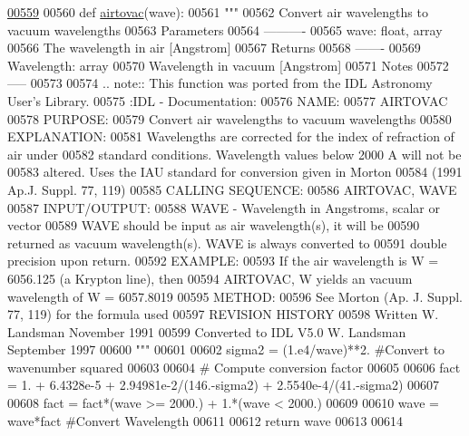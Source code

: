 \begin{DoxyCode}
\hypertarget{namespacepyneb_1_1utils_1_1physics_l00559}{}\hyperlink{namespacepyneb_1_1utils_1_1physics_aa6c19471b62528a32df5b8c371e69057}{00559} 
00560 \textcolor{keyword}{def }\hyperlink{namespacepyneb_1_1utils_1_1physics_aa6c19471b62528a32df5b8c371e69057}{airtovac}(wave):
00561     \textcolor{stringliteral}{"""}
00562 \textcolor{stringliteral}{Convert air wavelengths to vacuum wavelengths}
00563 \textcolor{stringliteral}{Parameters}
00564 \textcolor{stringliteral}{----------}
00565 \textcolor{stringliteral}{wave: float, array}
00566 \textcolor{stringliteral}{The wavelength in air [Angstrom]}
00567 \textcolor{stringliteral}{Returns}
00568 \textcolor{stringliteral}{-------}
00569 \textcolor{stringliteral}{Wavelength: array}
00570 \textcolor{stringliteral}{Wavelength in vacuum [Angstrom]}
00571 \textcolor{stringliteral}{Notes}
00572 \textcolor{stringliteral}{-----}
00573 \textcolor{stringliteral}{}
00574 \textcolor{stringliteral}{.. note:: This function was ported from the IDL Astronomy User's Library.}
00575 \textcolor{stringliteral}{:IDL - Documentation:}
00576 \textcolor{stringliteral}{NAME:}
00577 \textcolor{stringliteral}{AIRTOVAC}
00578 \textcolor{stringliteral}{PURPOSE:}
00579 \textcolor{stringliteral}{Convert air wavelengths to vacuum wavelengths}
00580 \textcolor{stringliteral}{EXPLANATION:}
00581 \textcolor{stringliteral}{Wavelengths are corrected for the index of refraction of air under}
00582 \textcolor{stringliteral}{standard conditions. Wavelength values below 2000 A will not be}
00583 \textcolor{stringliteral}{altered. Uses the IAU standard for conversion given in Morton}
00584 \textcolor{stringliteral}{(1991 Ap.J. Suppl. 77, 119)}
00585 \textcolor{stringliteral}{CALLING SEQUENCE:}
00586 \textcolor{stringliteral}{AIRTOVAC, WAVE}
00587 \textcolor{stringliteral}{INPUT/OUTPUT:}
00588 \textcolor{stringliteral}{WAVE - Wavelength in Angstroms, scalar or vector}
00589 \textcolor{stringliteral}{WAVE should be input as air wavelength(s), it will be}
00590 \textcolor{stringliteral}{returned as vacuum wavelength(s). WAVE is always converted to}
00591 \textcolor{stringliteral}{double precision upon return.}
00592 \textcolor{stringliteral}{EXAMPLE:}
00593 \textcolor{stringliteral}{If the air wavelength is W = 6056.125 (a Krypton line), then}
00594 \textcolor{stringliteral}{AIRTOVAC, W yields an vacuum wavelength of W = 6057.8019}
00595 \textcolor{stringliteral}{METHOD:}
00596 \textcolor{stringliteral}{See Morton (Ap. J. Suppl. 77, 119) for the formula used}
00597 \textcolor{stringliteral}{REVISION HISTORY}
00598 \textcolor{stringliteral}{Written W. Landsman November 1991}
00599 \textcolor{stringliteral}{Converted to IDL V5.0 W. Landsman September 1997}
00600 \textcolor{stringliteral}{    """}
00601     
00602     sigma2 = (1.e4/wave)**2. \textcolor{comment}{#Convert to wavenumber squared}
00603     
00604     \textcolor{comment}{# Compute conversion factor}
00605     
00606     fact = 1. + 6.4328e-5 + 2.94981e-2/(146.-sigma2) + 2.5540e-4/(41.-sigma2)
00607     
00608     fact = fact*(wave >= 2000.) + 1.*(wave < 2000.)
00609     
00610     wave = wave*fact \textcolor{comment}{#Convert Wavelength}
00611     
00612     \textcolor{keywordflow}{return} wave
00613 
00614 

\end{DoxyCode}
